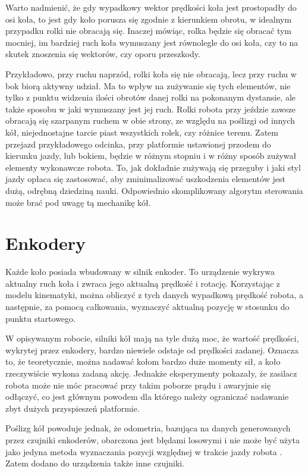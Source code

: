 		Warto nadmienić, że gdy wypadkowy wektor prędkości koła jest prostopadły do osi koła, to jest gdy
		koło porusza się zgodnie z kierunkiem obrotu, w idealnym przypadku rolki nie obracają się.
		Inaczej mówiąc, rolka będzie się obracać tym mocniej, im bardziej ruch koła wymuszany jest równolegle do osi koła, 
		czy to na skutek znoszenia się wektorów, czy oporu przeszkody.
		
		Przykładowo, przy ruchu naprzód, rolki koła się nie obracają, lecz przy ruchu w bok biorą aktywny udział.
		Ma to wpływ na zużywanie się tych elementów, nie tylko z punktu widzenia ilości obrotów danej rolki na pokonanym dystansie, 
		ale także sposobu w jaki wymuszany jest jej ruch.
		Rolki robota przy jeździe zawsze obracają się szarpanym ruchem w obie strony, ze względu na poślizgi od innych kół, 
		niejednostajne tarcie piast wszystkich rolek, czy różnice terenu. 
		Zatem przejazd przykładowego odcinka, przy platformie ustawionej przodem do kierunku jazdy, lub bokiem, będzie w różnym stopniu i w różny sposób zużywał elementy wykonawcze robota.
		To, jak dokładnie zużywają się przeguby i jaki styl jazdy opłaca się zastosować, aby zminimalizować uszkodzenia elementów jest dużą, odrębną dziedziną nauki.
		Odpowiednio skomplikowany algorytm sterowania może brać pod uwagę tą mechanikę kół.

\section{Enkodery}
	Każde koło posiada wbudowany w silnik enkoder. To urządzenie wykrywa aktualny ruch koła i zwraca jego aktualną prędkość i rotację.
	Korzystając z modelu kinematyki, można obliczyć z tych danych wypadkową prędkość robota, a następnie, za pomocą całkowania, wyznaczyć aktualną
	pozycję w stosunku do punktu startowego.
	
	W opisywanym robocie, silniki kół mają na tyle dużą moc, że wartość prędkości, wykrytej przez enkodery, bardzo niewiele odstaje od prędkości zadanej.
	Oznacza to, że teoretycznie, można nadawać kołom bardzo duże momenty sił, a koło rzeczywiście wykona zadaną akcję.
	Jednakże eksperymenty pokazały, że zasilacz robota może nie móc pracować przy takim poborze prądu i awaryjnie się odłączyć, co jest głównym powodem dla którego 
	należy ograniczać nadawanie zbyt dużych przyspieszeń platformie.

	Poślizg kół powoduje jednak, że odometria, bazująca na danych generowanych przez czujniki enkoderów, obarczona jest błędami losowymi i nie może być 
	użyta jako jedyna metoda wyznaczania pozycji względnej w trakcie jazdy robota \cite{heavy}. Zatem dodano do urządzenia także inne czujniki.
	
